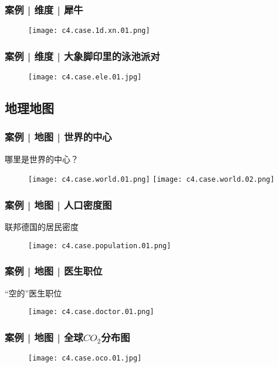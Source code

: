 \begin{frame}
  \frametitle{案例 | 维度 | 犀牛}
  \begin{figure}
    \centering
    \texttt{[image: c4.case.1d.xn.01.png]}
  \end{figure}
\end{frame}

\begin{frame}
  \frametitle{案例 | 维度 | 大象脚印里的泳池派对}
  \begin{figure}
    \centering
    \texttt{[image: c4.case.ele.01.jpg]}
  \end{figure}
\end{frame}

\subsection{地理地图}
\begin{frame}
  \frametitle{案例 | 地图 | 世界的中心}
  \begin{block}{哪里是世界的中心？}
    \begin{figure}
      \centering
      \texttt{[image: c4.case.world.01.png]}\quad
      \texttt{[image: c4.case.world.02.png]}
    \end{figure}
  \end{block}
\end{frame}

\begin{frame}
  \frametitle{案例 | 地图 | 人口密度图}
  \begin{block}{联邦德国的居民密度}
    \begin{figure}
      \centering
      \texttt{[image: c4.case.population.01.png]}
    \end{figure}
  \end{block}
\end{frame}

\begin{frame}
  \frametitle{案例 | 地图 | 医生职位}
  \begin{block}{“空的”医生职位}
    \begin{figure}
      \centering
      \texttt{[image: c4.case.doctor.01.png]}
    \end{figure}
  \end{block}
\end{frame}

\begin{frame}
  \frametitle{案例 | 地图 | 全球$CO_2$分布图}
    \begin{figure}
      \centering
      \texttt{[image: c4.case.oco.01.jpg]}
    \end{figure}
\end{frame}

